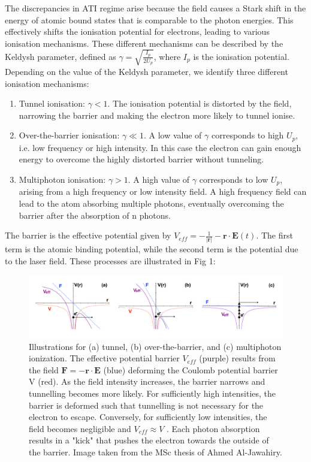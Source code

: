 \documentclass[11pt]{article}
\numberwithin{equation}{section}
\begin{document}
\par
The discrepancies in ATI regime arise because the field causes a Stark shift in the energy of atomic bound states that is comparable to the photon energies. This effectively shifts the ionisation potential for electrons, leading to various ionisation mechanisms. These different mechanisms can be described by the Keldysh parameter\cite{popruzhenko_2014_invariant}, defined as $\gamma = \sqrt{\frac{I_p}{2U_p}}$, where $I_p$ is the ionisation potential. Depending on the value of the Keldysh parameter, we identify three different ionisation mechanisms: 
\begin{enumerate}
    \item Tunnel ionisation: $\gamma < 1$. \newline
    The ionisation potential is distorted by the field, narrowing the barrier and making the electron more likely to tunnel ionise.
    \item Over-the-barrier ionisation: $\gamma \ll 1$. \newline
    A low value of $\gamma$ corresponds to high $U_p$, i.e. low frequency or high intensity. In this case the electron can gain enough energy to overcome the highly distorted barrier without tunneling.
    \item Multiphoton ionisation: $\gamma > 1$. \newline
    A high value of $\gamma$ corresponds to low $U_p$, arising from a high frequency or low intensity field. A high frequency field can lead to the atom absorbing multiple photons, eventually overcoming the barrier after the absorption of n photons.
\end{enumerate}
The barrier is the effective potential given by $V_{eff} = -\frac{1}{\left| \mathbf{r} \right|} - \mathbf{r} \cdot \mathbf{E}(t)$. The first term is the atomic binding potential, while the second term is the potential due to the laser field. These processes are illustrated in Fig 1:
\begin{figure}[!htb]
    \centering
    \includegraphics[width = 12cm]{Figures/tunnelingFig.png}
    \caption{ Illustrations for (a) tunnel, (b) over-the-barrier, and (c) multiphoton ionization. The effective potential barrier $V_{eff}$ (purple) results from the field $\mathbf{F} = -\mathbf{r} \cdot \mathbf{E}$ (blue) deforming the Coulomb potential barrier V (red). As the field intensity increases, the barrier narrows and tunnelling becomes more likely. For sufficiently high intensities, the barrier is deformed such that tunnelling is not necessary for the electron to escape. Conversely, for sufficiently low intensities, the field becomes negligible and $V_{eff} \approx V$ . Each photon absorption results in a "kick" that pushes the electron towards the outside of the barrier. Image taken from the MSc thesis of Ahmed Al-Jawahiry.}
    \label{fig:barrier}
\end{figure}
\end{document}

